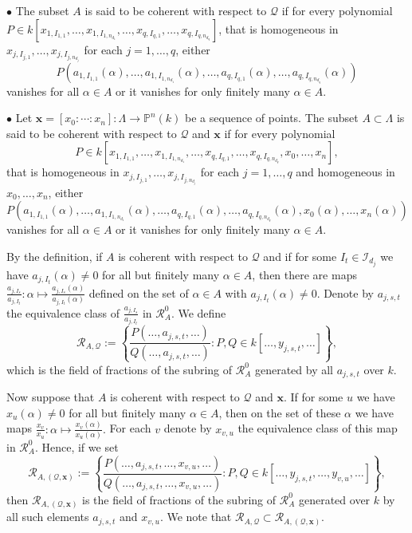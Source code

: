 \documentclass[12pt,leqno]{amsart}
\numberwithin{equation}{section}
\begin{document}
$\bullet$ The subset $A$ is said to be coherent with respect to $\mathcal{Q}$ if for every polynomial
$P\in k[x_{1,I_{1,1}},\ldots,x_{1,I_{1,n_{d_{1}}}},\ldots,x_{q,I_{q,1}},\ldots,x_{q,I_{q,n_{d_{q}}}}]$, that is homogeneous in $x_{j,I_{j, 1}},\ldots,x_{j,I_{j,n_{d_j}}}$ for each $j=1,\ldots,q$, either
$$P\left(a_{1,I_{1,1}}(\alpha),\ldots,a_{1,I_{1,n_{d_{1}}}}(\alpha),\ldots,a_{q,I_{q, 1}}(\alpha),\ldots,a_{q,I_{q, n_{d_{q}}}}(\alpha)\right)$$
vanishes for all $\alpha\in A$ or it vanishes for only finitely many $\alpha\in A$.

$\bullet$ Let $\mathbf{x}=[x_{0}:\cdots:x_n]:\Lambda\rightarrow\mathbb{P}^{n}(k)$ be a sequence of points. The subset $A\subset\Lambda$ is said to be coherent with respect to $\mathcal{Q}$ and $\mathbf{x}$ if for every polynomial
$$P\in k[x_{1,I_{1,1}},\ldots,x_{1,I_{1,n_{d_1}}},\ldots,x_{q,I_{q,1}},\ldots,x_{q, I_{q,n_{d_q}}},x_0,\ldots,x_n],$$
that is homogeneous in $x_{j,I_{j,1}},\ldots,x_{j,I_{j,n_{d_j}}}$ for each $j=1,\ldots,q$ and homogeneous in $x_0,\ldots,x_n$, either
$$P\left(a_{1,I_{1,1}}(\alpha), \ldots, a_{1,I_{1,n_{d_{1}}}}(\alpha),\ldots,a_{q,I_{q,1}}(\alpha),\ldots, a_{q,I_{q,n_{d_{q}}}}(\alpha),x_{0}(\alpha),\ldots,x_n(\alpha)\right)$$
vanishes for all $\alpha\in A$ or it vanishes for only finitely many $\alpha\in A$.

By the definition, if $A$ is coherent with respect to $\mathcal{Q}$ and if for some $I_{t} \in \mathcal{I}_{d_j}$ we have $a_{j, I_{t}}(\alpha) \neq 0$ for all but finitely many $\alpha \in A$, then there are maps $\frac{a_{j, I_{s}}}{a_{j, I_{t}}}:\alpha\mapsto \frac{a_{j, I_{s}}(\alpha)}{a_{j, I_{t}}(\alpha)}$ defined on the set of $\alpha \in A$ with $a_{j, I_{t}}(\alpha) \neq 0$. Denote by $a_{j, s, t}$ the equivalence class of $\frac{a_{j, I_{s}}}{a_{j, I_{t}}}$ in $\mathcal{R}_{A}^{0}$. We define
$$
\mathcal{R}_{A, \mathcal{Q}}:=\left\{\frac{P\left(\ldots, a_{j, s, t}, \ldots\right)}{Q\left(\ldots, a_{j, s, t}, \ldots\right)}: P, Q \in k\left[\ldots, y_{j, s, t}, \ldots\right]\right\},
$$
which is the field of fractions of the subring of $\mathcal{R}_{A}^{0}$ generated by all $a_{j,s,t}$ over $k$.

Now suppose that $A$ is coherent with respect to $\mathcal{Q}$ and $\mathbf{x}$. If for some $u$ we have $x_{u}(\alpha) \neq 0$ for all but finitely many $\alpha \in A$, then on the set of these $\alpha$ we have maps $\frac{x_v}{x_u}:\alpha\mapsto\frac{x_v(\alpha)}{x_u(\alpha)}.$ For each $v$ denote by $x_{v,u}$ the equivalence class of this map in $\mathcal{R}_{A}^{0}$. Hence, if we set
$$
\mathcal{R}_{A,(\mathcal{Q}, \mathbf{x})}:=\left\{\frac{P\left(\ldots,a_{j,s,t},\ldots, x_{v,u}, \ldots\right)}{Q\left(\ldots,a_{j, s, t},\ldots,x_{v,u}, \ldots\right)}: P, Q \in k\left[\ldots, y_{j,s,t}, \ldots, y_{v,u}, \ldots\right]\right\},
$$
then $\mathcal{R}_{A,(\mathcal{Q}, \mathbf{x})}$ is the field of fractions of the subring of $\mathcal{R}_{A}^{0}$ generated over $k$ by all such elements $a_{j,s,t}$ and $x_{v,u}$. We note that $\mathcal{R}_{A,\mathcal{Q}}\subset \mathcal{R}_{A,(\mathcal{Q},\mathbf{x})}$.
\end{document}
